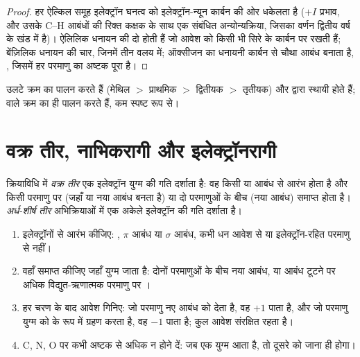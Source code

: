 \begin{proof}
हर ऐल्किल समूह इलेक्ट्रॉन घनत्व को इलेक्ट्रॉन-न्यून कार्बन की ओर धकेलता है
($+I$ प्रभाव, और उसके C--H आबंधों की रिक्त कक्षक के साथ एक संबंधित अन्योन्यक्रिया,
जिसका वर्णन द्वितीय वर्ष के खंड में है)। ऐलिलिक धनायन की
दो  होती हैं जो आवेश को किसी भी सिरे के कार्बन पर रखती हैं;
बेंज़िलिक धनायन की चार, जिनमें तीन वलय में; ऑक्सीजन का 
धनायनी कार्बन से चौथा आबंध बनाता है, , जिसमें हर परमाणु का
अष्टक पूरा है।
\end{proof}

 उलटे क्रम का पालन करते हैं (मेथिल $>$ प्राथमिक $>$ द्वितीयक
$>$ तृतीयक) और  द्वारा स्थायी होते हैं; 
 वाले क्रम का ही पालन करते हैं, कम स्पष्ट रूप से।

\section{वक्र तीर, नाभिकरागी और इलेक्ट्रॉनरागी}

\begin{definition}[वक्र तीर]\label{def:b1:electronic-effects:curly-arrow}
क्रियाविधि में \emph{वक्र तीर} एक इलेक्ट्रॉन युग्म की
गति दर्शाता है: वह किसी  या आबंध से आरंभ होता है और किसी परमाणु पर
(जहाँ  या नया आबंध बनता है) या दो परमाणुओं के बीच (नया
आबंध) समाप्त होता है। \emph{अर्ध-शीर्ष तीर}  अभिक्रियाओं में
एक अकेले इलेक्ट्रॉन की गति दर्शाता है।
\end{definition}

\begin{method}[वक्र तीर खींचना]\label{met:b1:electronic-effects:curly-arrows}
\begin{enumerate}
  \item इलेक्ट्रॉनों से आरंभ कीजिए: , $\pi$ आबंध या $\sigma$
        आबंध, कभी धन आवेश से या इलेक्ट्रॉन-रहित परमाणु से नहीं।
  \item वहाँ समाप्त कीजिए जहाँ युग्म जाता है: दोनों परमाणुओं के बीच नया आबंध, या
        आबंध टूटने पर अधिक विद्युत-ऋणात्मक परमाणु पर ।
  \item हर चरण के बाद आवेश गिनिए: जो परमाणु नए आबंध को  देता है, वह
        $+1$ पाता है, और जो परमाणु युग्म को  के रूप में ग्रहण करता है,
        वह $-1$ पाता है; कुल आवेश संरक्षित रहता है।
  \item C, N, O पर कभी अष्टक से अधिक न होने दें: जब एक युग्म आता है, तो दूसरे को
        जाना ही होगा।
\end{enumerate}
\end{method}

